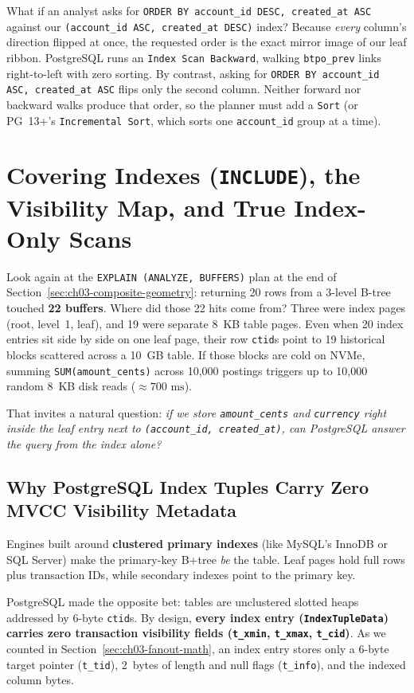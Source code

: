 What if an analyst asks for \texttt{ORDER BY account\_id DESC, created\_at ASC} against our \texttt{(account\_id ASC, created\_at DESC)} index? Because \emph{every} column's direction flipped at once, the requested order is the exact mirror image of our leaf ribbon. PostgreSQL runs an \texttt{Index Scan Backward}, walking \texttt{btpo\_prev} links right-to-left with zero sorting. By contrast, asking for \texttt{ORDER BY account\_id ASC, created\_at ASC} flips only the second column. Neither forward nor backward walks produce that order, so the planner must add a \texttt{Sort} (or PG~13+'s \texttt{Incremental Sort}, which sorts one \texttt{account\_id} group at a time).

\section{Covering Indexes (\texttt{INCLUDE}), the Visibility Map, and True Index-Only Scans}
\label{sec:ch03-visibility-map}

Look again at the \texttt{EXPLAIN (ANALYZE, BUFFERS)} plan at the end of Section~\ref{sec:ch03-composite-geometry}: returning 20 rows from a 3-level B-tree touched \textbf{22 buffers}. Where did those 22 hits come from? Three were index pages (root, level~1, leaf), and 19 were separate 8~KB table pages. Even when 20 index entries sit side by side on one leaf page, their row \texttt{ctid}s point to 19 historical blocks scattered across a 10~GB table. If those blocks are cold on NVMe, summing \texttt{SUM(amount\_cents)} across 10,000 postings triggers up to 10,000 random 8~KB disk reads ($\approx 700\text{ ms}$).

That invites a natural question: \emph{if we store \texttt{amount\_cents} and \texttt{currency} right inside the leaf entry next to \texttt{(account\_id, created\_at)}, can PostgreSQL answer the query from the index alone?}

\subsection{Why PostgreSQL Index Tuples Carry Zero MVCC Visibility Metadata}

Engines built around \textbf{clustered primary indexes} (like MySQL's InnoDB or SQL Server) make the primary-key B+tree \emph{be} the table. Leaf pages hold full rows plus transaction IDs, while secondary indexes point to the primary key.

PostgreSQL made the opposite bet: tables are unclustered slotted heaps addressed by 6-byte \texttt{ctid}s. By design, \textbf{every index entry (\texttt{IndexTupleData}) carries zero transaction visibility fields (\texttt{t\_xmin}, \texttt{t\_xmax}, \texttt{t\_cid})}. As we counted in Section~\ref{sec:ch03-fanout-math}, an index entry stores only a 6-byte target pointer (\texttt{t\_tid}), 2~bytes of length and null flags (\texttt{t\_info}), and the indexed column bytes.

